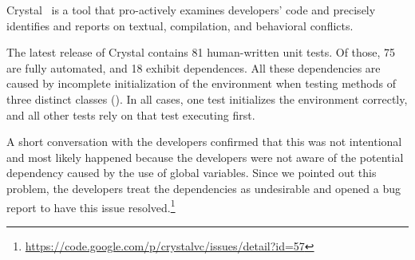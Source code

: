 Crystal~\cite{crystal} is a tool that
pro-actively examines developers' code and precisely identifies and reports on textual, compilation, and behavioral conflicts.

The latest release of Crystal contains 81 human-written unit tests. 
Of those, 75 are fully automated, and 18 exhibit
dependences.
All these dependencies are caused by incomplete initialization of the
environment when testing methods of three distinct classes
().
In all cases, one test initializes the environment correctly, and all
other tests rely on that test executing first. 

A short conversation with the developers confirmed that this was not
intentional and most likely happened because the developers were not
aware of the potential dependency caused by the use of global
variables. Since we pointed out this problem, the developers treat the
dependencies as undesirable and opened a bug report to have this issue
resolved.\footnote{\url{https://code.google.com/p/crystalvc/issues/detail?id=57}}

%
%
%
%

